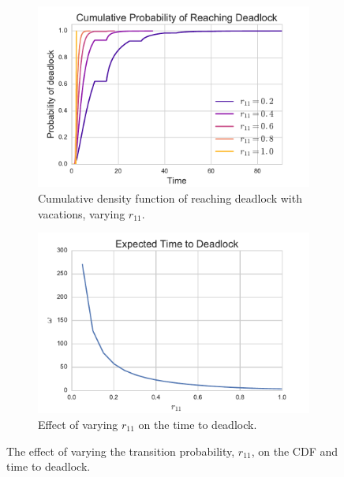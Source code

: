 \documentclass{article}
\begin{document}
\begin{figure}
\begin{center}
\begin{subfigure}[b]{0.45\textwidth}
    \includegraphics[width=\textwidth]{img/cdf_vary_r11.pdf}
    \caption{Cumulative density function of reaching deadlock with vacations, varying $r_{11}$.}
    \label{fig:cdf_varyr11}
\end{subfigure}
\begin{subfigure}[b]{0.45\textwidth}
    \includegraphics[width=\textwidth]{img/ttd_vary_r11.pdf}
    \caption{Effect of varying $r_{11}$ on the time to deadlock.}
    \label{fig:ttd_varyr11}
\end{subfigure}
\end{center}
\caption{The effect of varying the transition probability, $r_{11}$, on the CDF and time to deadlock.}
\label{fig:ttdcdf_varyr11}
\end{figure}



\end{document}

